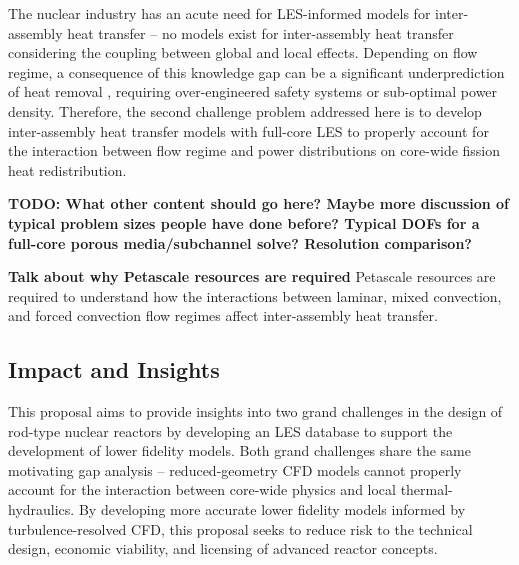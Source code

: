The nuclear industry has an acute need for LES-informed models for
inter-assembly heat transfer -- no models exist for inter-assembly heat
transfer considering the coupling between global and local effects. Depending
on flow regime, a consequence of this knowledge gap can be a significant
underprediction of heat removal \cite{gerschenfeld}, requiring over-engineered
safety systems or sub-optimal power density. Therefore, the second challenge
problem addressed here is to develop inter-assembly heat transfer models with
full-core LES to properly account for the interaction between flow regime and
power distributions on core-wide fission heat redistribution. 


{\bf TODO: What other content should go here? Maybe more discussion of typical
problem sizes people have done before? Typical DOFs for a full-core porous
media/subchannel solve? Resolution comparison?}

{\bf Talk about why Petascale resources are required}
Petascale resources are required to understand how the interactions between
laminar, mixed convection, and forced convection flow regimes affect
inter-assembly heat transfer.




\vspace{-.25in}
\subsection{Impact and Insights}
\vspace{-.2in}

This proposal aims to provide insights into two grand challenges in the design
of rod-type nuclear reactors by developing an LES database to support the
development of lower fidelity models. Both grand challenges share the same
motivating gap analysis -- reduced-geometry CFD models cannot properly account
for the interaction between core-wide physics and local thermal-hydraulics. By
developing more accurate lower fidelity models informed by turbulence-resolved
CFD, this proposal seeks to reduce risk to the technical design, economic
viability, and licensing of advanced reactor concepts. 

